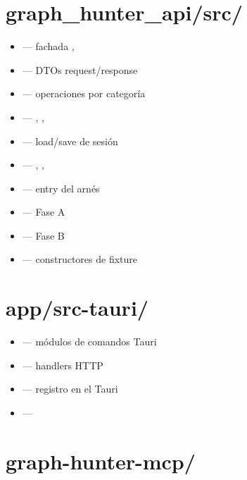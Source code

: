 \section{graph\_hunter\_api/src/}

\begin{itemize}\setlength{\itemsep}{0pt}
    \item {} --- fachada ,
    \item {} --- DTOs request/response
    \item {} --- operaciones por
        categoría
    \item {} --- ,
        , 
    \item {} --- load/save de sesión
    \item {} ---
        , , 
    \item {} --- entry del arnés
    \item {} --- Fase A
    \item {} --- Fase B
    \item {} --- constructores de
        fixture
\end{itemize}

\section{app/src-tauri/}

\begin{itemize}\setlength{\itemsep}{0pt}
    \item {} --- módulos de comandos Tauri
    \item {} --- handlers HTTP
    \item {} --- registro en el
         Tauri
    \item {} ---
\end{itemize}

\section{graph-hunter-mcp/}

